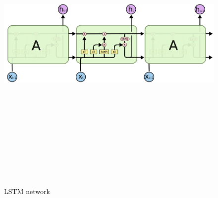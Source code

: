 \documentclass[11pt, a4paper]{article}
\begin{document}
\begin{figure}[H]
    \centering
    \includegraphics[width=15cm,height=15cm,keepaspectratio]{Figures/rnn3.png}
    \caption{LSTM network}
    \label{rnn2}
\end{figure} 
\end{document}
